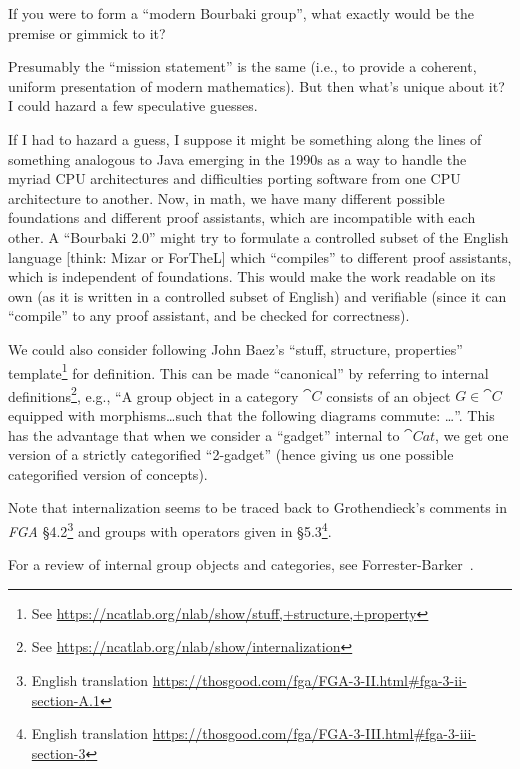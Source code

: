 \begin{node}[Puzzle]\label{bourbaki-0005}%
If you were to form a ``modern Bourbaki group'', what exactly would be
the premise or gimmick to it?

Presumably the ``mission statement'' is the same (i.e., to provide a
coherent, uniform presentation of modern mathematics). But then what's
unique about it? I could hazard a few speculative guesses.

\begin{node}\label{bourbaki-0009}%
If I had to hazard a guess, I suppose it might be something along the
lines of something analogous to Java emerging in the 1990s as a way to
handle the myriad CPU architectures and difficulties porting software
from one CPU architecture to another. Now, in math, we have many
different possible foundations and different proof assistants, which are
incompatible with each other. A ``Bourbaki 2.0'' might try to formulate
a controlled subset of the English language [think: Mizar or ForTheL]
which ``compiles'' to different proof assistants, which is independent
of foundations. This would make the work readable on its own (as it is
written in a controlled subset of English) and verifiable (since it can
``compile'' to any proof assistant, and be checked for correctness).
\end{node}

\begin{node}\label{bourbaki-0008}%
We could also consider following John Baez's ``stuff, structure,
properties'' template\footnote{See \url{https://ncatlab.org/nlab/show/stuff,+structure,+property}} for definition. This can be made ``canonical'' by
referring to internal definitions\footnote{See \url{https://ncatlab.org/nlab/show/internalization}},
e.g., ``A group object in a category $\cat{C}$ consists of an object
$G\in\cat{C}$ equipped with morphisms\dots such that the following
diagrams commute: \dots''. This has the advantage that when we consider
a ``gadget'' internal to $\cat{Cat}$, we get one version of a strictly
categorified ``2-gadget'' (hence giving us one possible categorified
version of concepts).

\begin{node}\label{bourbaki-000A}%
Note that internalization seems to be traced back to Grothendieck's
comments in \textit{FGA} \S4.2\footnote{English translation \url{https://thosgood.com/fga/FGA-3-II.html\#fga-3-ii-section-A.1}}
and groups with operators given in \S5.3\footnote{English translation \url{https://thosgood.com/fga/FGA-3-III.html\#fga-3-iii-section-3}}.
\end{node}

\begin{node}\label{bourbaki-000B}%
For a review of internal group objects and categories, see Forrester-Barker~\cite{forresterbarker2002group}.
\end{node}
\end{node}
\end{node}

